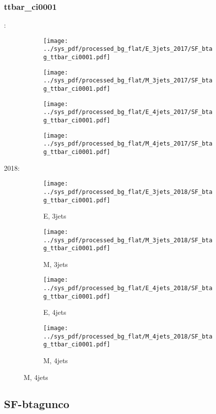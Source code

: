 \documentclass{beamer}
\begin{document}
\begin{frame}
\frametitle{ttbar_ci0001}
\fontsize{5}{1}:
\begin{figure}
\centering
\begin{subfigure}[b]{0.24\textwidth}
\texttt{[image: ../sys\_pdf/processed\_bg\_flat/E\_3jets\_2017/SF\_btag\_ttbar\_ci0001.pdf]}
\end{subfigure}
\begin{subfigure}[b]{0.24\textwidth}
\texttt{[image: ../sys\_pdf/processed\_bg\_flat/M\_3jets\_2017/SF\_btag\_ttbar\_ci0001.pdf]}
\end{subfigure}
\begin{subfigure}[b]{0.24\textwidth}
\texttt{[image: ../sys\_pdf/processed\_bg\_flat/E\_4jets\_2017/SF\_btag\_ttbar\_ci0001.pdf]}
\end{subfigure}
\begin{subfigure}[b]{0.24\textwidth}
\texttt{[image: ../sys\_pdf/processed\_bg\_flat/M\_4jets\_2017/SF\_btag\_ttbar\_ci0001.pdf]}
\end{subfigure}
\end{figure}
2018:
\begin{figure}
\centering
\begin{subfigure}[b]{0.24\textwidth}
\texttt{[image: ../sys\_pdf/processed\_bg\_flat/E\_3jets\_2018/SF\_btag\_ttbar\_ci0001.pdf]}
\captionsetup{font=tiny}
\caption{E, 3jets}
\end{subfigure}
\begin{subfigure}[b]{0.24\textwidth}
\texttt{[image: ../sys\_pdf/processed\_bg\_flat/M\_3jets\_2018/SF\_btag\_ttbar\_ci0001.pdf]}
\captionsetup{font=tiny}
\caption{M, 3jets}
\end{subfigure}
\begin{subfigure}[b]{0.24\textwidth}
\texttt{[image: ../sys\_pdf/processed\_bg\_flat/E\_4jets\_2018/SF\_btag\_ttbar\_ci0001.pdf]}
\captionsetup{font=tiny}
\caption{E, 4jets}
\end{subfigure}
\begin{subfigure}[b]{0.24\textwidth}
\texttt{[image: ../sys\_pdf/processed\_bg\_flat/M\_4jets\_2018/SF\_btag\_ttbar\_ci0001.pdf]}
\captionsetup{font=tiny}
\caption{M, 4jets}
\end{subfigure}
\end{figure}
\end{frame}


\subsection{SF-btagunco}
\end{document}
